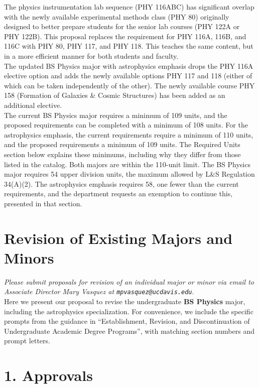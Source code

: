 \documentclass[12pt]{article}
\begin{document}
\noindent
The physics instrumentation lab sequence (PHY 116ABC) has significant
overlap with the newly available experimental methods class (PHY 80)
originally designed to better prepare students for the senior lab
courses (PHY 122A or PHY 122B).  This proposal replaces the
requirement for PHY 116A, 116B, and 116C with PHY 80, PHY 117, and
PHY 118.  This teaches the same content, but in a more efficient
manner for both students and faculty.\\[5pt]

\noindent
The updated BS Physics major with astrophysics emphasis drops the
PHY 116A elective option and adds the newly available options PHY 117
and 118 (either of which can be taken independently of the other).  The
newly available course PHY 158 (Formation of Galaxies \& Cosmic
Structures) has been added as an
additional elective.\\[5pt]

\noindent
The current BS Physics major requires a minimum of 109 units, and the
proposed requirements can be completed with a minimum of 108 units.
For the astrophysics emphasis, the current requirements require a
minimum of 110 units, and the proposed requirements a minimum of 109
units.  The Required Units section below explains these minimums,
including why they differ from those listed in the catalog.  Both
majors are within the 110-unit limit.  The BS Physics major requires
54 upper division units, the maximum allowed by L\&S Regulation
34(A)(2).  The astrophysics emphasis requires 58, one fewer than the
current requirements, and the department requests an exemption to
continue this, presented in that section.

\section*{Revision of Existing Majors and Minors}
{\it Please submit proposals for revision of an individual major or minor via email to Associate Director Mary Vasquez at \texttt{mpvasquez@ucdavis.edu}}.\\[4pt]

\noindent
Here we present our proposal to revise the undergraduate {\bf BS
  Physics} major, including the astrophysics specialization.  For
convenience, we include the specific prompts from the guidance in
``Establishment, Revision, and Discontinuation of Undergraduate
Academic Degree Programs'', with matching section numbers and prompt
letters.

\section*{1. Approvals}
\end{document}
